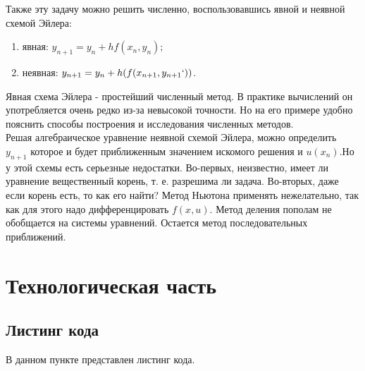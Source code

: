 \documentclass[a4paper, 12pt]{article}
\begin{document}
	\clearpage
	\newpage
	Также эту задачу можно решить численно, воспользовавшись явной и неявной схемой Эйлера:
	\begin{enumerate}
		\item явная: $y_{n + 1} = y_n + hf(x_n, y_n)$;
		\item неявная: $y_{n + 1} = y_n + h(f(x_{n + 1}, y_{n + 1}`	)) $.
	\end{enumerate}
	\hspace*{5mm} Явная схема Эйлера - простейший численный метод. В практике вычислений он употребляется очень редко из-за невысокой точности. Но на его примере удобно пояснить способы построения и исследования численных методов.
	\\ \hspace*{5mm} Решая алгебраическое уравнение неявной схемой Эйлера, можно определить $y_{n+1}$ которое и будет приближенным значением искомого решения и $u(x_n)$.Но у этой схемы есть серьезные недостатки. Во-первых, неизвестно, имеет ли уравнение вещественный корень, т. е. разрешима ли задача. Во-вторых, даже если корень есть, то как его найти? Метод Ньютона применять нежелательно, так как для этого надо дифференцировать $f(x, u)$. Метод деления пополам не обобщается на системы уравнений. Остается метод последовательных приближений.

\newpage
\section{Технологическая часть}

	\subsection{Листинг кода}
	В данном пункте представлен листинг кода.

\end{document}
